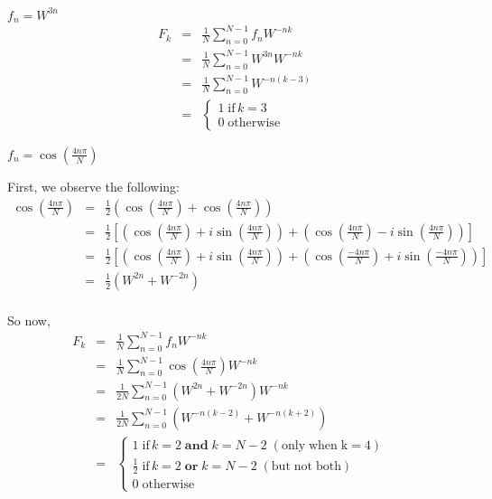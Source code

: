 \documentclass[12pt]{article}
\begin{document}
\begin{list}{.}{}
\begin{list}{)}{}
\item $f_n = W^{3n}$\\
\begin{eqnarray*}
F_k &=& \frac{1}{N} \sum_{n=0}^{N-1}f_nW^{-nk}\\
&=& \frac{1}{N} \sum_{n=0}^{N-1}W^{3n}W^{-nk}\\
&=& \frac{1}{N} \sum_{n=0}^{N-1}W^{-n(k - 3)}\\
&=& \left\{ \begin{array}{lcl}
1\; \mathrm{if}\, k = 3 \\
0\; \mathrm{otherwise}&
\end{array} \right.
\end{eqnarray*}

\item $f_n = \cos(\frac{4n\pi}{N})$

First, we observe the following:\\
\begin{eqnarray*}
\cos(\frac{4n\pi}{N}) &=& \frac{1}{2}(\cos(\frac{4n\pi}{N}) +
\cos(\frac{4n\pi}{N}))\\
&=& \frac{1}{2}\left[
\left(\cos(\frac{4n\pi}{N}) + i\sin(\frac{4n\pi}{N})\right) +
\left(\cos(\frac{4n\pi}{N}) - i\sin(\frac{4n\pi}{N})\right)\right]\\
&=& \frac{1}{2}\left[
\left(\cos(\frac{4n\pi}{N}) + i\sin(\frac{4n\pi}{N})\right) +
\left(\cos(\frac{-4n\pi}{N}) + i\sin(\frac{-4n\pi}{N})\right)\right]\\
&=& \frac{1}{2}\left(W^{2n} + W^{-2n}\right)\\
\end{eqnarray*}

So now,
\begin{eqnarray*}
F_k &=& \frac{1}{N} \sum_{n=0}^{N-1}f_nW^{-nk}\\
&=& \frac{1}{N} \sum_{n=0}^{N-1}\cos\left(\frac{4n\pi}{N}\right)W^{-nk}\\
&=& \frac{1}{2N} \sum_{n=0}^{N-1}\left(W^{2n} + W^{-2n}\right)W^{-nk}\\
&=& \frac{1}{2N} \sum_{n=0}^{N-1}\left(W^{-n(k-2)} + W^{-n(k+2)}\right)\\
&=& \left\{ \begin{array}{lcl}
1\; \mathrm{if}\, k = 2\;\mathbf{and}\;k=N-2\;\mathrm{(only\;when\;k=4)} \\
\frac{1}{2}\;\mathrm{if}\,k = 2\;\mathbf{or}\;k=N-2\;\mathrm{(but\;not\;both)}\\
0\; \mathrm{otherwise}&
\end{array} \right.
\end{eqnarray*}


\end{list}
\end{list}
\end{document}
